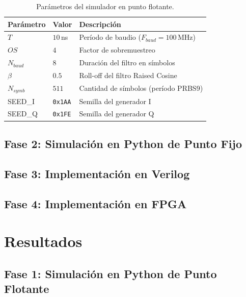 \documentclass[11pt,a4paper]{article}
\begin{document}
\begin{table}[H]
    \centering
    \begin{tabular}{lll}
        \toprule
        \textbf{Parámetro} & \textbf{Valor} & \textbf{Descripción}                      \\
        \midrule
        $T$                & $10$\,ns       & Período de baudio ($F_{baud} = 100$\,MHz) \\
        $OS$               & $4$            & Factor de sobremuestreo                   \\
        $N_{baud}$         & $8$            & Duración del filtro en símbolos           \\
        $\beta$            & $0.5$          & Roll-off del filtro Raised Cosine         \\
        $N_{symb}$         & $511$          & Cantidad de símbolos (período PRBS9)      \\
        SEED\_I            & \texttt{0x1AA} & Semilla del generador I                   \\
        SEED\_Q            & \texttt{0x1FE} & Semilla del generador Q                   \\
        \bottomrule
    \end{tabular}
    \caption{Parámetros del simulador en punto flotante.}
\end{table}

\subsection{Fase 2: Simulación en Python de Punto Fijo}

\subsection{Fase 3: Implementación en Verilog}

\subsection{Fase 4: Implementación en FPGA}

\section{Resultados}

\subsection{Fase 1: Simulación en Python de Punto Flotante}
\end{document}

